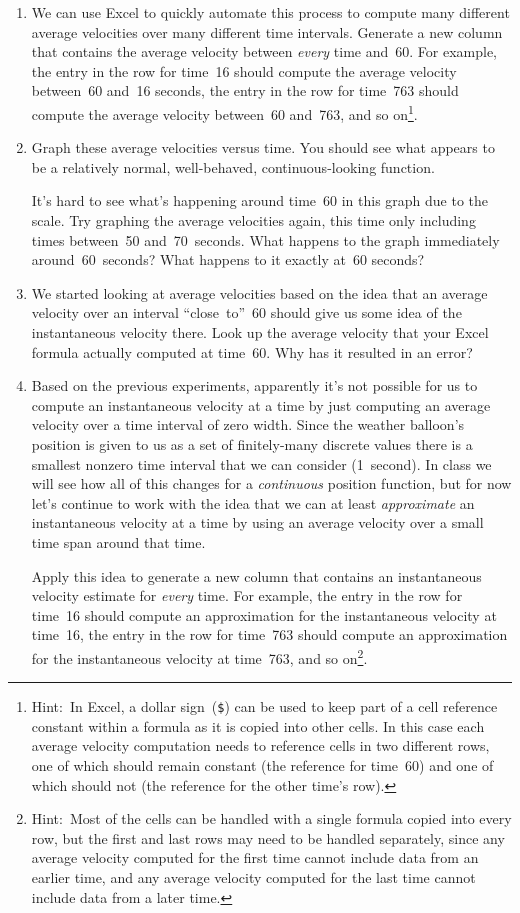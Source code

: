 \begin{enumerate}[\bf {\thesection}a.]
	\item We can use Excel to quickly automate this process to compute many different average velocities over many different time intervals. Generate a new column that contains the average velocity between \textit{every} time and~60. For example, the entry in the row for time~16 should compute the average velocity between~60 and~16 seconds, the entry in the row for time~763 should compute the average velocity between~60 and~763, and so on\footnote{Hint:~In Excel, a dollar sign~(\texttt{\$}) can be used to keep part of a cell reference constant within a formula as it is copied into other cells. In this case each average velocity computation needs to reference cells in two different rows, one of which should remain constant (the reference for time~60) and one of which should not (the reference for the other time's row).}.
	
	\item Graph these average velocities versus time. You should see what appears to be a relatively normal, well-behaved, continuous-looking function.
	
	It's hard to see what's happening around time~60 in this graph due to the scale. Try graphing the average velocities again, this time only including times between~50 and~70~seconds. What happens to the graph immediately around~60~seconds? What happens to it exactly at~60 seconds?
	
	\item We started looking at average velocities based on the idea that an average velocity over an interval ``close~to''~60 should give us some idea of the instantaneous velocity there. Look up the average velocity that your Excel formula actually computed at time~60. Why has it resulted in an error?
	
	\item Based on the previous experiments, apparently it's not possible for us to compute an instantaneous velocity at a time by just computing an average velocity over a time interval of zero width. Since the weather balloon's position is given to us as a set of finitely-many discrete values there is a smallest nonzero time interval that we can consider (1~second). In class we will see how all of this changes for a \textit{continuous} position function, but for now let's continue to work with the idea that we can at least \textit{approximate} an instantaneous velocity at a time by using an average velocity over a small time span around that time.
	
	Apply this idea to generate a new column that contains an instantaneous velocity estimate for \textit{every} time. For example, the entry in the row for time~16 should compute an approximation for the instantaneous velocity at time~16, the entry in the row for time~763 should compute an approximation for the instantaneous velocity at time~763, and so on\footnote{Hint:~Most of the cells can be handled with a single formula copied into every row, but the first and last rows may need to be handled separately, since any average velocity computed for the first time cannot include data from an earlier time, and any average velocity computed for the last time cannot include data from a later time.}.
	

\end{enumerate}
